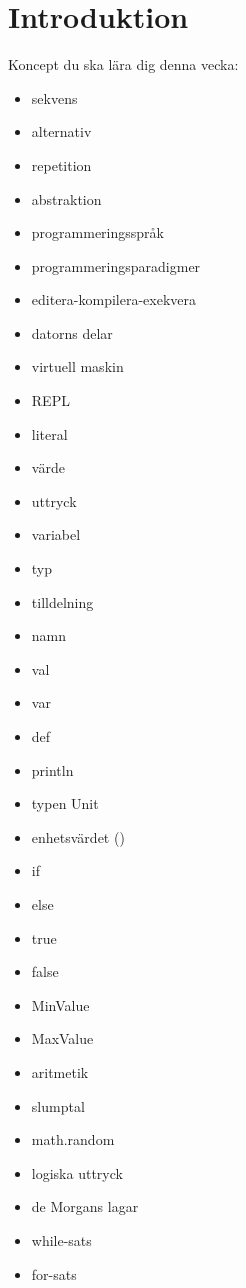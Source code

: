 \chapter{Introduktion}\label{chapter:W01}
Koncept du ska lära dig denna vecka:
\begin{multicols}{2}\begin{itemize}[nosep,label={$\square$},leftmargin=*]
\item sekvens
\item alternativ
\item repetition
\item abstraktion
\item programmeringsspråk
\item programmeringsparadigmer
\item editera-kompilera-exekvera
\item datorns delar
\item virtuell maskin
\item REPL
\item literal
\item värde
\item uttryck
\item variabel
\item typ
\item tilldelning
\item namn
\item val
\item var
\item def
\item println
\item typen Unit
\item enhetsvärdet ()
\item if
\item else
\item true
\item false
\item MinValue
\item MaxValue
\item aritmetik
\item slumptal
\item math.random
\item logiska uttryck
\item de Morgans lagar
\item while-sats
\item for-sats\end{itemize}\end{multicols}
